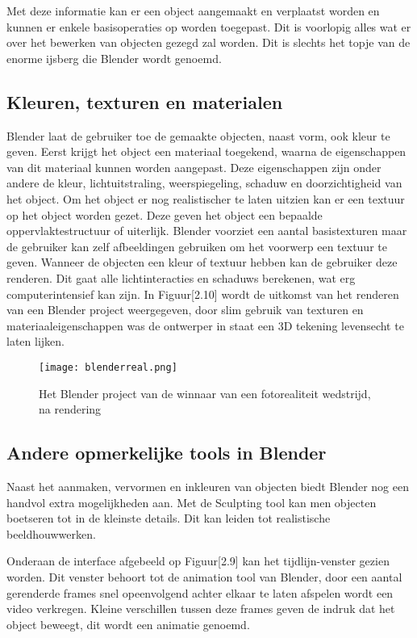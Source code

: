\par
Met deze informatie kan er een object aangemaakt en verplaatst worden en kunnen er enkele basisoperaties op worden toegepast. Dit is voorlopig alles wat er over het bewerken van objecten gezegd zal worden. Dit is slechts het topje van de enorme ijsberg die Blender wordt genoemd.


\subsection{Kleuren, texturen en materialen}
Blender laat de gebruiker toe de gemaakte objecten, naast vorm, ook kleur te geven. Eerst krijgt het object een materiaal toegekend, waarna de eigenschappen van dit materiaal kunnen worden aangepast. Deze eigenschappen zijn onder andere de kleur, lichtuitstraling, weerspiegeling, schaduw en doorzichtigheid van het object. Om het object er nog realistischer te laten uitzien kan er een textuur op het object worden gezet. Deze geven het object een bepaalde oppervlaktestructuur of uiterlijk. Blender voorziet een aantal basistexturen maar de gebruiker kan zelf afbeeldingen gebruiken om het voorwerp een textuur te geven. Wanneer de objecten een kleur of textuur hebben kan de gebruiker deze renderen. Dit gaat alle lichtinteracties en schaduws berekenen, wat erg computerintensief kan zijn. In Figuur[2.10] wordt de uitkomst van het renderen van een Blender project weergegeven, door slim gebruik van texturen en materiaaleigenschappen was de ontwerper in staat een 3D tekening levensecht te laten lijken.\citep*{BLEN2}

\begin{figure}[h]
\texttt{[image: blenderreal.png]}
\caption{Het Blender project van de winnaar van een fotorealiteit wedstrijd, na rendering}
\end{figure}

\subsection{Andere opmerkelijke tools in Blender}
Naast het aanmaken, vervormen en inkleuren van objecten biedt Blender nog een handvol extra mogelijkheden aan. Met de Sculpting tool kan men objecten boetseren tot in de kleinste details. Dit kan leiden tot realistische beeldhouwwerken.

\par 
Onderaan de interface afgebeeld op Figuur[2.9] kan het tijdlijn-venster gezien worden. Dit venster behoort tot de animation tool van Blender, door een aantal gerenderde frames snel opeenvolgend achter elkaar te laten afspelen wordt een video verkregen. Kleine verschillen tussen deze frames geven de indruk dat het object beweegt, dit wordt een animatie genoemd. 

